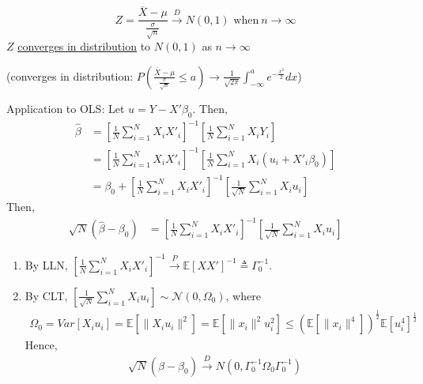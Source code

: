 \documentclass[11pt]{elegantbook}
\begin{document}
\begin{theorem}\label{CLT}
    $$Z=\frac{\overline{X}-\mu}{\frac{\sigma}{\sqrt{n}}} \xrightarrow {D} N(0,1) \text{ when}\ n\to \infty$$
    $Z$ \underline{converges in distribution} to $N(0,1)$ as $n\to \infty$

    (converges in distribution: $P(\frac{\overline{X}-\mu}{\frac{\sigma}{\sqrt{n}}}\leq a)\rightarrow \frac{1}{\sqrt{2\pi}}\int_{-\infty}^ae^{-\frac{x^2}{2}}dx$)
\end{theorem}
Application to OLS: Let $u=Y-X'\beta_0$. Then,
\begin{equation}
    \begin{aligned}
        \hat{\beta}&=\left[\frac{1}{N}\sum_{i=1}^N X_i X'_i\right]^{-1}\left[\frac{1}{N}\sum_{i=1}^N X_iY_i\right]\\
        &=\left[\frac{1}{N}\sum_{i=1}^N X_i X'_i\right]^{-1}\left[\frac{1}{N}\sum_{i=1}^N X_i(u_i+X'_i\beta_0)\right]\\
        &=\beta_0+\left[\frac{1}{N}\sum_{i=1}^N X_i X'_i\right]^{-1}\left[\frac{1}{\sqrt{N}}\sum_{i=1}^N X_i u_i\right]
    \end{aligned}
    \nonumber
\end{equation}
Then,
\begin{equation}
    \begin{aligned}
        \sqrt{N}(\hat{\beta}-\beta_0)&=\left[\frac{1}{N}\sum_{i=1}^N X_iX
        '_i\right]^{-1}\left[\frac{1}{\sqrt{N}}\sum_{i=1}^N X_i u_i\right]
    \end{aligned}
    \nonumber
\end{equation}
\begin{enumerate}
    \item By LLN, $\left[\frac{1}{N}\sum_{i=1}^N X_iX
    '_i\right]^{-1} \xrightarrow{P} \mathbb{E}[XX']^{-1}\triangleq \Gamma_0^{-1}$.
    \item By CLT, $\left[\frac{1}{\sqrt{N}}\sum_{i=1}^N X_i u_i\right]\sim \mathcal{N}(0,\Omega_0)$, where
    \begin{equation}
        \begin{aligned}
            \Omega_0=Var[X_iu_i]=\mathbb{E}[\|X_iu_i\|^2]=\mathbb{E}[\|x_i\|^2u_i^2]\leq \left(\mathbb{E}[\|x_i\|^4]\right)^\frac{1}{2}\mathbb{E}[u_i^4]^{\frac{1}{2}}
        \end{aligned}
        \nonumber
    \end{equation}
    Hence,
    \begin{equation}
        \begin{aligned}
            \sqrt{N}(\hat{\beta}-\beta_0) \xrightarrow{D} N\left(0,\Gamma_0^{-1}\Omega_0 \Gamma_0^{-1}\right)
        \end{aligned}
        \nonumber
    \end{equation}
\end{enumerate}
\end{document}

